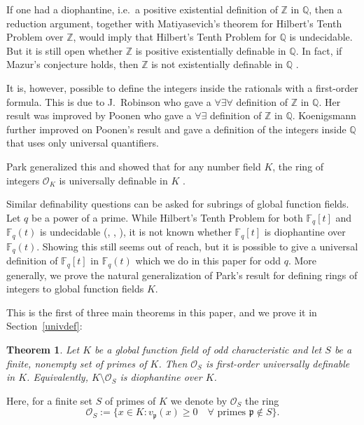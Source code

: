 \documentclass[12pt,reqno]{amsart}
\newcommand{\OO}{\mathcal{O}}
\newcommand{\QQ}{\mathbb{Q}}
\newcommand{\ZZ}{\mathbb{Z}}
\newcommand{\FF}{\mathbb{F}}
\newcommand{\pp}{\mathfrak{p}}
\newtheorem{thm}{Theorem}[section]
\theoremstyle{definition}
\begin{document}
If one had a diophantine, i.e.\ a positive existential definition of $\mathbb{Z}$ in $\mathbb{Q}$,
then a reduction argument, together with Matiyasevich's theorem for
Hilbert's Tenth Problem over $\mathbb{Z}$, would imply that Hilbert's
Tenth Problem for $\mathbb{Q}$ is undecidable.
But it is still open whether $\mathbb{Z}$ is positive existentially definable
in $\mathbb{Q}$. In fact, if Mazur's conjecture holds, then $\ZZ$ is
not existentially definable in $\QQ$ \cite{Maz92}.

It is, however, possible to define the integers inside the rationals
with a first-order formula. This is due to J.\ Robinson \cite{Rob49}
who gave a $\forall \exists \forall$ definition of $\mathbb{Z}$ in
$\mathbb{Q}$. Her result was improved by Poonen  \cite{Poo09} who gave a
$\forall \exists$ definition of $\mathbb{Z}$ in $\mathbb{Q}$.
 Koenigsmann \cite{Koe13} further improved on Poonen's result and
gave a definition of the integers inside $\mathbb{Q}$ that uses only
universal quantifiers. 


 Park generalized this and
showed that for any number field $K$, the ring of integers $\OO_K$ is
universally definable in $K$ \cite{Park}.


Similar definability questions can be asked for subrings of global
function fields.  Let $q$ be a power of a prime. While Hilbert's
Tenth Problem for both $\FF_q[t]$ and $\FF_q(t)$ is undecidable
(\cite{Den79}, \cite{Ph91}, \cite{Vi94}), it is not known whether
$\FF_{q}[t]$ is diophantine over $\FF_{q}(t)$. Showing this still
seems out of reach, but it is possible to give a universal definition
of $\FF_q[t]$ in $\FF_q(t)$ which we do in this paper for odd $q$. More generally,
we prove the natural generalization of Park's result for defining rings of integers to global function
fields $K$.


This is the first of three main theorems in this paper, and we prove
it in Section~\ref{univdef}:
\begin{thm}\label{univdefthm}
  Let $K$ be a global function field of odd characteristic and let $S$
  be a finite, nonempty set of primes of $K$. Then $\OO_S$ is first-order
  universally definable in $K$. Equivalently, $K\setminus \OO_S$ is
  diophantine over $K$.
\end{thm}

Here, for a finite set $S$ of primes of $K$ we denote by $\OO_S$ the ring
\[
\OO_S:=\{x\in K: v_{\pp}(x)\geq 0 \quad \forall \text{ primes }\pp \not\in S\}.
\]
\end{document}
